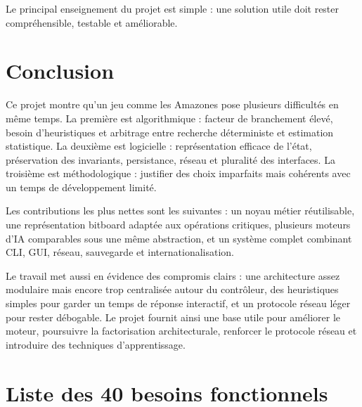 \documentclass[a4paper]{article}
\begin{document}
Le principal enseignement du projet est simple : une solution utile doit rester compréhensible, testable et améliorable.


\section*{Conclusion}

Ce projet montre qu'un jeu comme les Amazones pose plusieurs difficultés en même temps. La première est algorithmique : facteur de branchement élevé, besoin d'heuristiques et arbitrage entre recherche déterministe et estimation statistique. La deuxième est logicielle : représentation efficace de l'état, préservation des invariants, persistance, réseau et pluralité des interfaces. La troisième est méthodologique : justifier des choix imparfaits mais cohérents avec un temps de développement limité.

Les contributions les plus nettes sont les suivantes : un noyau métier réutilisable, une représentation bitboard adaptée aux opérations critiques, plusieurs moteurs d'IA comparables sous une même abstraction, et un système complet combinant CLI, GUI, réseau, sauvegarde et internationalisation.

Le travail met aussi en évidence des compromis clairs : une architecture assez modulaire mais encore trop centralisée autour du contrôleur, des heuristiques simples pour garder un temps de réponse interactif, et un protocole réseau léger pour rester débogable. Le projet fournit ainsi une base utile pour améliorer le moteur, poursuivre la factorisation architecturale, renforcer le protocole réseau et introduire des techniques d'apprentissage.





\appendix
\newpage

\section{Liste des 40 besoins fonctionnels}
\end{document}
